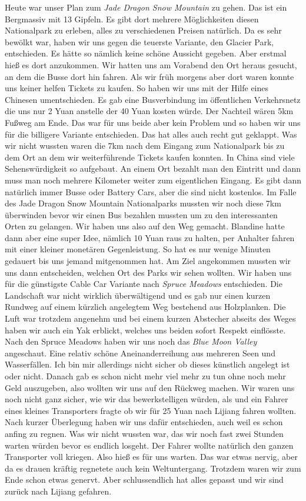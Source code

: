 \documentclass[11pt]{book}
\begin{document}
Heute war unser Plan zum \emph{Jade Dragon Snow Mountain} zu gehen. Das ist ein Bergmassiv mit 13 Gipfeln. Es gibt 
dort mehrere Möglichkeiten diesen Nationalpark zu erleben, alles zu verschiedenen Preisen natürlich. Da es sehr bewölkt 
war, haben wir uns gegen die teuerste Variante, den Glacier Park, entschieden. Es hätte so nämlich keine schöne 
Aussicht gegeben. Aber erstmal hieß es dort anzukommen. Wir hatten uns am Vorabend den Ort heraus gesucht, an dem die 
Busse dort hin fahren. Als wir früh morgens aber dort waren konnte uns keiner helfen Tickets zu kaufen. So haben wir 
uns mit der Hilfe eines Chinesen umentschieden. Es gab eine Busverbindung im öffentlichen Verkehrsnetz die uns nur 
2 Yuan anstelle der 40 Yuan kosten würde. Der Nachteil wären 5km Fußweg am Ende. Das war für uns beide aber kein 
Problem und so haben wir uns für die billigere Variante entschieden. Das hat alles auch recht gut geklappt. Was 
wir nicht wussten waren die 7km nach dem Eingang zum Nationalpark bis zu dem Ort an dem wir weiterführende Tickets 
kaufen konnten. In China sind viele Sehenswürdigkeit so aufgebaut. An einem Ort bezahlt man den Eintritt und dann muss 
man noch mehrere Kilometer weiter zum eigentlichen Eingang. Es gibt dann natürlich immer Busse oder Battery Cars, 
aber die sind nicht kostenlos. Im Falle des Jade Dragon Snow Mountain Nationalparks mussten wir noch diese 7km 
überwinden bevor wir einen Bus bezahlen mussten um zu den interessanten Orten zu gelangen. Wir haben uns also auf den 
Weg gemacht. Blandine hatte dann aber eine super Idee, nämlich 10 Yuan raus zu halten, per Anhalter fahren mit einer 
kleiner monetären Gegenleistung. So hat es nur wenige Minuten gedauert bis uns jemand mitgenommen hat. Am Ziel 
angekommen mussten wir uns dann entscheiden, welchen Ort des Parks wir sehen wollten. Wir haben uns für die günstigste 
Cable Car Variante nach \emph{Spruce Meadows} entschieden. Die Landschaft war nicht wirklich überwältigend und es
gab nur einen kurzen Rundweg auf einem kürzlich angelegtem Weg bestehend aus Holzplanken. Die Luft war trotzdem 
angenehm und bei einem kurzen Abstecher abseits des Weges haben wir auch ein Yak erblickt, welches uns beiden sofort
Respekt einflösste. Nach den Spruce Meadows haben wir uns noch das \emph{Blue Moon Valley} angeschaut. Eine relativ 
schöne Aneinanderreihung aus mehreren Seen und Wasserfällen. Ich bin mir allerdings nicht sicher ob dieses 
künstlich angelegt ist oder nicht.
Danach gab es schon nicht mehr viel mehr zu tun ohne noch mehr Geld auszugeben, also wollten wir uns auf den Rückweg 
machen. Wir waren uns noch nicht ganz sicher, wie wir das bewerkstelligen würden, als und ein Fahrer eines kleines 
Transporters fragte ob wir für 25 Yuan nach Lijiang fahren wollten. Nach kurzer Überlegung haben wir uns dafür 
entschieden, auch weil es schon anfing zu regnen. Was wir nicht wussten war, das wir noch fast zwei Stunden warten 
würden bevor es endlich losgeht. Der Fahrer wollte natürlich den ganzen Transporter voll kriegen. Also hieß es für 
uns warten. Das war etwas nervig, aber da es drauen kräftig regnetete auch kein Weltuntergang. Trotzdem waren wir 
zum Ende schon etwas genervt. Aber schlussendlich hat alles gepasst und wir sind zurück nach Lijiang gefahren.
\end{document}
